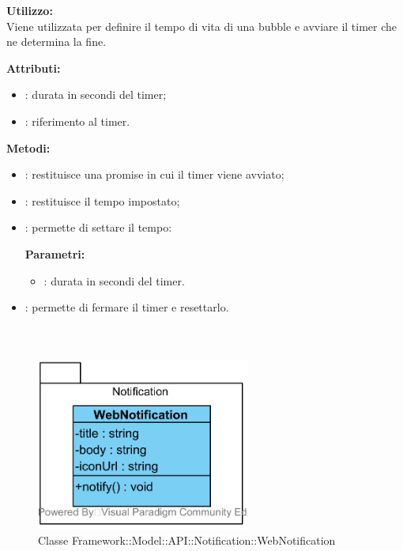 \textbf{Utilizzo:}\\
Viene utilizzata per definire il tempo di vita di una bubble e avviare il timer che ne determina la fine.



\textbf{Attributi:}
\begin{itemize}
	\item {}: durata in secondi del timer;
	\item {}: riferimento al timer.
\end{itemize}

\textbf{Metodi:}
\begin{itemize}
	\item {}: restituisce una promise in cui il timer viene avviato;
	\item {}: restituisce il tempo impostato;
	\item {}: permette di settare il tempo:
	
	\indent\textbf{Parametri:}
	\begin{itemize}
		\item {}: durata in secondi del timer.
	\end{itemize}
	\item {}: permette di fermare il timer e resettarlo.
\end{itemize}

\subparagraph{\class}\mbox{}\\ \label{\class}
\begin{figure}[H]
	\centering
	\includegraphics[width=7cm]{./diagrammi/framework/model/api/notification.png}
	\caption{Classe Framework::Model::API::Notification::WebNotification}
\end{figure}

